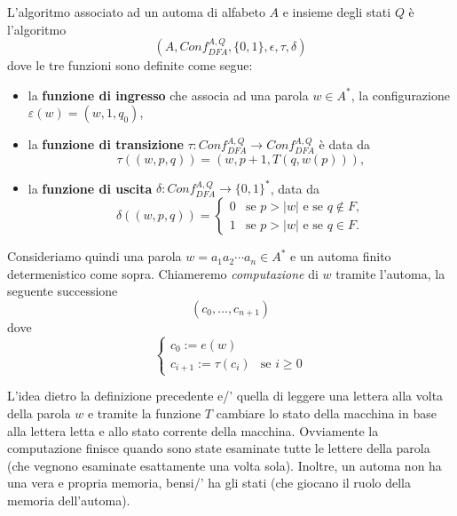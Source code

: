 \begin{defi}\label{def:4}
L'algoritmo associato ad un automa di alfabeto $A$ e insieme degli stati $Q$ è l'algoritmo $$(A,Conf_{DFA}^{A,Q}, \{0,1\},\epsilon,\tau,\delta)$$ dove le tre funzioni sono definite come segue:
\begin{itemize}
    \item la \textbf{funzione di ingresso} che associa ad una parola $w\in A^*$, la configurazione $\varepsilon(w) = (w,1,q_0)$,

    \item la \textbf{funzione di transizione} $\tau: Conf_{DFA}^{A,Q} \to Conf_{DFA}^{A,Q}$ è data da
    \[
    \tau((w,p,q)) = (w,p+1,T(q,w(p))),
    \]

    \item la \textbf{funzione di uscita} $\delta: Conf_{DFA}^{A,Q} \to \{0,1\}^*$, data da
    \[
    \delta((w,p,q)) =
    \begin{cases}
    0 & \text{se } p>|w| \text{ e se } q\notin F, \\
    1 & \text{se } p>|w| \text{ e se } q\in F.
    \end{cases}
    \]
\end{itemize}
\end{defi}

Consideriamo quindi una parola $w=a_1a_2\cdots a_n \in A^*$ e un automa finito determenistico come sopra.
Chiameremo \textit{computazione} di $w$ tramite l'automa,
la seguente successione
\[
(c_0, \dots ,c_{n+1})
\]
dove
\[
\left\{
        \begin{matrix}
            c_0:= e(w)
            \\
            c_{i+1}:= \tau (c_i)& \text{se }i \geq 0
        \end{matrix}
\right.
\]
\begin{rema}
    L'idea dietro la definizione precedente e/' 
    quella di leggere una lettera alla volta della parola $w$
    e tramite la funzione $T$ cambiare lo stato della macchina in base alla lettera letta
    e allo stato corrente della macchina.
    Ovviamente la computazione finisce quando sono state esaminate tutte le lettere
    della parola (che vegnono esaminate esattamente una volta sola).
    Inoltre, un automa non ha una vera e propria memoria,
    bensi/' ha gli stati (che giocano il ruolo della memoria dell'automa).
\end{rema}

